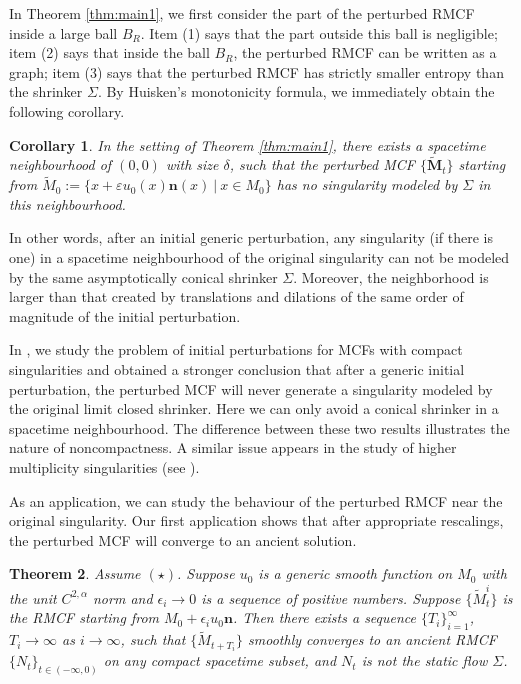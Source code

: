 \documentclass[12pt]{amsart}
\numberwithin{equation}{section}
\newtheorem{theorem}{Theorem}[section]
\newtheorem{corollary}[theorem]{Corollary}
\numberwithin{equation}{section}
\newcommand{\eps}{\varepsilon}
\newcommand{\dt}{\delta}
\newcommand{\al}{\alpha}
\newcommand{\bn}{\mathbf{n}}
\begin{document}
	{In Theorem \ref{thm:main1}, we first consider the part of the perturbed RMCF inside a large ball $B_R$. Item (1) says that the part outside this ball is negligible; item (2) says that inside the ball $B_R$, the perturbed RMCF can be written as a graph; item (3) says that the perturbed RMCF has strictly smaller entropy than the shrinker $\Sigma$.}
	By Huisken's monotonicity formula, we immediately obtain the following corollary.
	
	\begin{corollary}\label{CorMain}
		In the setting of Theorem \ref{thm:main1}, there exists a spacetime neighbourhood of $(0,0)$ with size $\dt$, such that the perturbed MCF $\{\widetilde{\mathbf{M}}_t\}$ starting from $\widetilde{M}_0:=\{x+\eps u_0(x)\mathbf n(x)\ |\ x\in M_0\}$ has no singularity modeled by $\Sigma$ in this neighbourhood.
	\end{corollary}
	
	
	
	In other words, after an initial generic perturbation, any singularity (if there is one) in a spacetime neighbourhood of the original singularity can not be modeled by the same asymptotically conical shrinker $\Sigma$. Moreover, the neighborhood is larger than that created by translations and dilations of the same order of magnitude of the initial perturbation.
	
	In \cite{SX}, we study the problem of initial perturbations for MCFs with compact singularities and obtained a stronger conclusion that after a generic initial perturbation, the perturbed MCF will never generate a singularity modeled by the original limit closed shrinker. Here we can only avoid a conical shrinker in a spacetime neighbourhood. The difference between these two results illustrates the nature of noncompactness. A similar issue appears in the study of higher multiplicity singularities (see \cite{Su}).
	
	
	As an application, we can study the behaviour of the perturbed RMCF near the original singularity. Our first application shows that after appropriate rescalings, the perturbed MCF will converge to an ancient solution. 
	
	
	\begin{theorem}\label{thm:ancient} Assume $(\star)$. 
		Suppose $u_0$ is a generic smooth function on $M_0$ with the unit $C^{2,\al}$ norm and $\epsilon_i\to 0$ is a sequence of positive numbers. Suppose $\{\widetilde{M}^i_t\}$ is the RMCF starting from $M_0+\epsilon_i u_0\bn$. Then there exists a sequence $\{T_i\}_{i=1}^\infty$, $T_i\to\infty$ as $i\to\infty$, such that $\{\widetilde M_{t+T_i}\}$ smoothly converges to an ancient RMCF $\{N_t\}_{t\in(-\infty,0)}$ on any compact spacetime subset, and $N_t$ is not the static flow $\Sigma$.
	\end{theorem}
	
\end{document}
